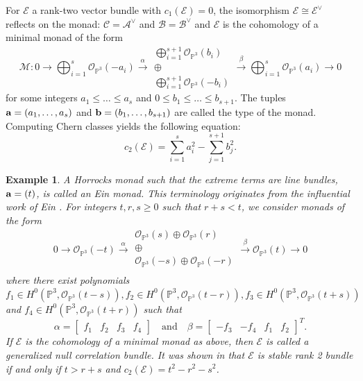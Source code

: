 \documentclass[twoside,reqno]{amsart}
\theoremstyle{plain}
\newtheorem{example}[theorem]{Example}
\newcommand{\ba}{{\bf a}}
\newcommand{\bb}{{\bf b}}
\newcommand{\lra}{\longrightarrow}
\newcommand{\op}[1]{{\mathcal O}_{\mathbb{P}^{#1}}}
\newcommand{\E}{\mathcal{E}}
\newcommand{\cA}{\mathcal{A}}
\newcommand{\cB}{\mathcal{B}}
\newcommand{\cC}{\mathcal{C}}
\newcommand{\cM}{\mathcal{M}}
\begin{document}
For $\E$ a rank-two vector bundle with $c_1(\E)=0$, the isomorphism $\E \cong \E^\vee$ reflects on the monad: $\cC = \cA^\vee$ and $\cB = \cB^\vee$ and $\E$ is the cohomology of a minimal monad of the form
\begin{equation}\label{eq:hoorcks-monad}
    \cM : 0 \lra \bigoplus_{i=1}^s \op3(-a_i) \stackrel{\alpha}{\lra} \begin{matrix} \displaystyle
    \bigoplus_{i=1}^{s+1} \op3(b_i) \\ \displaystyle \oplus \\ \displaystyle \bigoplus_{i=1}^{s+1} \op3(-b_i)
\end{matrix} \stackrel{\beta}{\lra} \bigoplus_{i=1}^s \op3(a_i) \lra 0
\end{equation}
for some integers $a_1\leq \dots \leq a_s$ and $0 \leq b_1\leq \dots \leq b_{s+1}$. The tuples $\ba = (a_1, \dots , a_s)$ and $\bb = (b_1, \dots , b_{s+1})$ are called the type of the monad. Computing Chern classes yields the following equation:
\begin{equation}\label{eq:monad-c2}
c_2(\E)=\sum_{i=1}^sa_i^2-\sum_{j=1}^{s+1} b_j^2.
\end{equation}
%
\begin{example}\label{ein-monad}
\textup{A Horrocks monad such that the extreme terms are line bundles, $\ba = (t)$, is called an 
Ein monad. This terminology originates from the influential work of Ein \cite{Ein88}. For integers $t, r,s \geq 0$  
such that $r+s<t$, we consider monads of the form
\[
0 \lra \op3(-t) \stackrel{\alpha}{\lra} \begin{matrix}
  \displaystyle  \op3(s)\oplus \op3(r) \\
  \displaystyle  \oplus \\
  \displaystyle  \op3(-s) \oplus \op3(-r) \\
\end{matrix} 
\stackrel{\beta}{\lra} \op3(t) \lra 0
\]
where there exist polynomials $f_1\in H^0(\mathbb{P}^3,\mathcal{O}_{\mathbb{P}^3}(t-s)), f_2\in H^0(\mathbb{P}^3,\mathcal{O}_{\mathbb{P}^3}(t-r)), f_3\in H^0(\mathbb{P}^3,\mathcal{O}_{\mathbb{P}^3}(t+s))$ and $f_4\in H^0(\mathbb{P}^3,\mathcal{O}_{\mathbb{P}^3}(t+r))$ such that  
\[
\alpha = \begin{bmatrix}
    f_1 & f_2 & f_3 & f_4
\end{bmatrix} \quad \text{and} \quad \beta = \begin{bmatrix}
    -f_3 & -f_4 & f_1 & f_2
\end{bmatrix}^T.
\]
If $\E$ is the cohomology of a minimal monad as above, then $\E$ is called a \textit{generalized null correlation bundle}. It 
was shown in \cite{Ein88} that $\E$ is stable rank 2 bundle if and only if $t>r+s$ and $c_2(\E)=t^2-r^2-s^2$.
}
\end{example}
\end{document}

